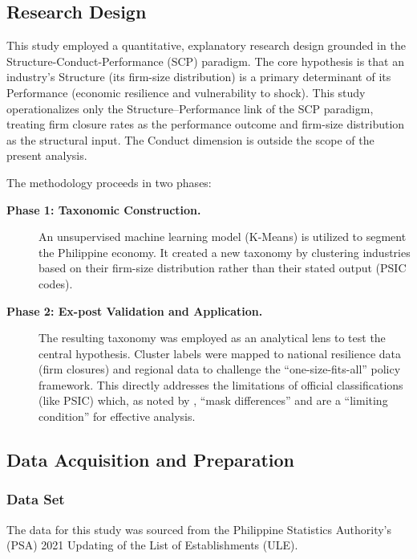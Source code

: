 \documentclass[acmtog, nonacm]{acmart}
\begin{document}
\subsection{Research Design}
This study employed a quantitative, explanatory research design grounded in the Structure-Conduct-Performance (SCP) paradigm. The core hypothesis is that an industry's Structure (its firm-size distribution) is a primary determinant of its Performance (economic resilience and vulnerability to shock). This study operationalizes only the Structure--Performance link of the SCP paradigm, treating firm closure rates as the performance outcome and firm-size distribution as the structural input. The Conduct dimension is outside the scope of the present analysis.

The methodology proceeds in two phases:

\begin{description}
    \item[\textbf{Phase 1: Taxonomic Construction.}] An unsupervised machine learning model (K-Means) is utilized to segment the Philippine economy. It created a new taxonomy by clustering industries based on their firm-size distribution rather than their stated output (PSIC codes).
    
    \item[\textbf{Phase 2: Ex-post Validation and Application.}] The resulting taxonomy was employed as an analytical lens to test the central hypothesis. Cluster labels were mapped to national resilience data (firm closures) and regional data to challenge the ``one-size-fits-all'' policy framework. This directly addresses the limitations of official classifications (like PSIC) which, as noted by \citet{wachs2022}, ``mask differences'' and are a ``limiting condition'' for effective analysis.
\end{description}

\subsection{Data Acquisition and Preparation}

\subsubsection{Data Set}
The data for this study was sourced from the Philippine Statistics Authority's (PSA) 2021 Updating of the List of Establishments (ULE).
\end{document}
